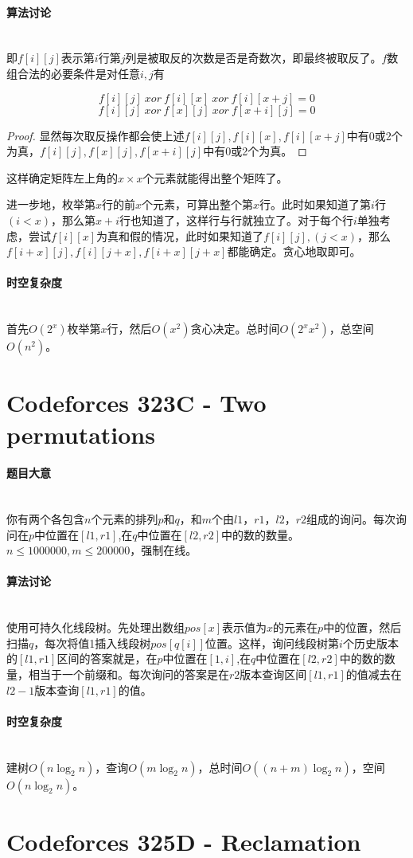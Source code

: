 \documentclass[UTF8]{ctexart}
\newcommand{\myparagraph}[1]{\paragraph{#1}\mbox{}\\}
\theoremstyle{nonumberplain}
\newtheorem{proof}{\hspace{1em}证明：}
\begin{document}
		\myparagraph{算法讨论}
		
			即$f[i][j]$表示第$i$行第$j$列是被取反的次数是否是奇数次，即最终被取反了。$f$数组合法的必要条件是对任意$i,j$有
			
			$$f[i][j]\ xor\ f[i][x]\ xor\ f[i][x+j]=0$$
			$$f[i][j]\ xor\ f[x][j]\ xor\ f[x+i][j]=0$$
			
			\begin{proof}显然每次取反操作都会使上述$f[i][j],f[i][x],f[i][x+j]$中有0或2个为真，$f[i][j],f[x][j],f[x+i][j]$中有0或2个为真。\end{proof}
			
			这样确定矩阵左上角的$x \times x$个元素就能得出整个矩阵了。
			
			进一步地，枚举第$x$行的前$x$个元素，可算出整个第$x$行。此时如果知道了第$i$行$(i<x)$，那么第$x+i$行也知道了，这样行与行就独立了。对于每个行$i$单独考虑，尝试$f[i][x]$为真和假的情况，此时如果知道了$f[i][j],(j<x)$，那么$f[i+x][j],f[i][j+x],f[i+x][j+x]$都能确定。贪心地取即可。
	
		\myparagraph{时空复杂度}
		
			首先$O(2^x)$枚举第$x$行，然后$O(x^2)$贪心决定。总时间$O(2^xx^2)$，总空间$O(n^2)$。
		
	\section{Codeforces 323C - Two permutations}
	
		\myparagraph{题目大意}
		
			你有两个各包含$n$个元素的排列$p$和$q$，和$m$个由$l1$，$r1$，$l2$，$r2$组成的询问。每次询问在$p$中位置在$[l1,r1]$,在$q$中位置在$[l2,r2]$中的数的数量。$n \leq 1000000, m \leq 200000$，强制在线。
			
		\myparagraph{算法讨论}
		
			使用可持久化线段树。先处理出数组$pos[x]$表示值为$x$的元素在$p$中的位置，然后扫描$q$，每次将值1插入线段树$pos[q[i]]$位置。这样，询问线段树第$i$个历史版本的$[l1,r1]$区间的答案就是，在$p$中位置在$[1,i]$,在$q$中位置在$[l2,r2]$中的数的数量，相当于一个前缀和。每次询问的答案是在$r2$版本查询区间$[l1,r1]$的值减去在$l2-1$版本查询$[l1,r1]$的值。
	
		\myparagraph{时空复杂度}
		
			建树$O(n\log_2n)$，查询$O(m\log_2n)$，总时间$O((n+m)\log_2n)$，空间$O(n\log_2n)$。
	
	\section{Codeforces 325D - Reclamation}
		
\end{document}
